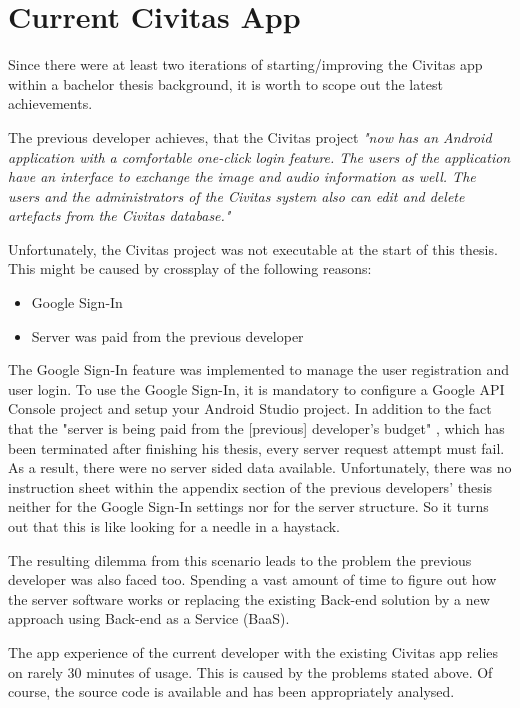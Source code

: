 \section{Current Civitas App}
Since there were at least two iterations of starting/improving the Civitas app within a bachelor thesis background, it is worth to scope out the latest achievements.

The previous developer achieves, that the Civitas project \textit{"now has an Android application with a comfortable one-click login feature. The users of the application have an interface to exchange the image and audio information as well. The users and the administrators of the Civitas system also can edit and delete artefacts from the Civitas database."} \citep[p. 54]{Ganapijev18} 


Unfortunately, the Civitas project was not executable at the start of this thesis. This might be caused by crossplay of the following reasons:

\begin{itemize}
\item Google Sign-In
\item Server was paid from the previous developer
\end{itemize}

The Google Sign-In feature was implemented to manage the user registration and user login. To use the Google Sign-In, it is mandatory to configure a Google API Console project and setup your Android Studio project. 
In addition to the fact that the "server is being paid from the [previous] developer's budget" \citep[p. 51]{Ganapijev18}, which has been terminated after finishing his thesis, every server request attempt must fail. As a result, there were no server sided data available. 
Unfortunately, there was no instruction sheet within the appendix section of the previous developers' thesis neither for the Google Sign-In settings nor for the server structure. So it turns out that this is like looking for a needle in a haystack.

The resulting dilemma from this scenario leads to the problem the previous developer was also faced too. 
Spending a vast amount of time to figure out how the server software works or replacing the existing Back-end solution by a new approach using Back-end as a Service (BaaS).

The app experience of the current developer with the existing Civitas app relies on rarely 30 minutes of usage. This is caused by the problems stated above. Of course, the source code is available and has been appropriately analysed.

